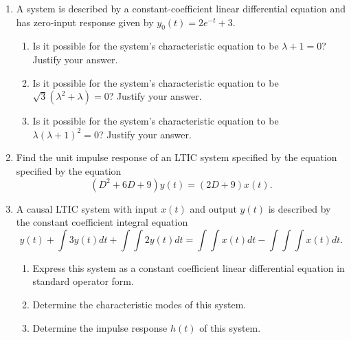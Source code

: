 \documentclass{article}
\begin{document}
\begin{enumerate}[label=\textbf{\thesubsubsection}]
\[		\]
		\begin{enumerate}[label=(\alph*)]
			\item What is the characteristic equation of this system?
			\vfill
			\item What are the characteristic modes of this system?
			\vfill
		  \item Assuming \(y_{\mathrm{zir}}(0)=4\), \(\dot{y}_{\mathrm{zir}}(0) = -18\), and \(\ddot{y}_{\mathrm{zir}}(0) = 0\), determine this system's zero-input response \(y_{\mathrm{zir}}(t).\) Simplify \(y_{\mathrm{zir}}(t)\) to include only real terms (i.e., no \(j\)'s should appear in your answer).
			\vfill
		\end{enumerate}
		\newpage
		\setcounter{subsubsection}{11}
	\item A system is described by a constant-coefficient linear differential equation and has zero-input response given by \(y_0(t) = 2e^{-t}+3.\)
		\begin{enumerate}[label=(\alph*)]
			\item Is it possible for the system's characteristic equation to be \(\lambda + 1 = 0\)? Justify your answer.
				\vfill
			\item Is it possible for the system's characteristic equation to be \(\sqrt{3}(\lambda^2 + \lambda) = 0\)? Justify your answer.
				\vfill
			\item Is it possible for the system's characteristic equation to be \(\lambda(\lambda + 1)^2 = 0\)? Justify your answer.
				\vfill
		\end{enumerate}
		\newpage
		\setcounter{subsection}{3}
		\setcounter{subsubsection}{5}
	\item Find the unit impulse response of an LTIC system specified by the equation specified by the equation
		\[
			(D^2 + 6D + 9)y(t) = (2D + 9)x(t).
		\]
		\newpage
		\setcounter{subsubsection}{7}
	  \item A causal LTIC system with input \(x(t)\) and output \(y(t)\) is described by the constant coefficient integral equation
			\[
			  y(t) + \int 3y(t)dt + \int\int 2y(t)dt = \int\int x(t)dt - \int\int\int x(t)dt.
			\]
			\begin{enumerate}[label=(\alph*)]
				\item Express this system as a constant coefficient linear differential equation in standard operator form.
					\vfill
				\item Determine the characteristic modes of this system.
					\vfill
				\item Determine the impulse response \(h(t)\) of this system.

\end{enumerate}
\end{enumerate}
\end{document}

